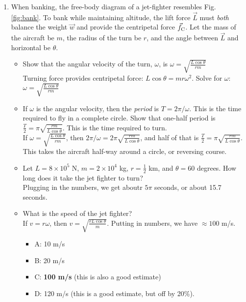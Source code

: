\documentclass[10pt]{article}
\begin{document}
\begin{enumerate}
\item When banking, the free-body diagram of a jet-fighter resembles Fig. \ref{fig:bank}.  To bank while maintaining altitude, the lift force $\vec{L}$ must \textit{both} balance the weight $\vec{w}$ and provide the centripetal force $\vec{f}_{\rm C}$.  Let the mass of the aircraft be $m$, the radius of the turn be $r$, and the angle between $\vec{L}$ and horizontal be $\theta$.
\begin{itemize}
\item Show that the angular velocity of the turn, $\omega$, is $\omega = \sqrt{\frac{L\cos\theta}{rm}}$ \\
Turning force provides centripetal force: $L\cos\theta = mr\omega^2$.  Solve for $\omega$: $\omega = \sqrt{\frac{L\cos\theta}{rm}}$
\item If $\omega$ is the angular velocity, then the \textit{period} is $T = 2\pi/\omega$.  This is the time required to fly in a complete circle.  Show that one-half period is $\frac{T}{2} = \pi\sqrt{\frac{r m}{L\cos\theta}}$.  This is the time required to turn. \\
If $\omega = \sqrt{\frac{L\cos\theta}{rm}}$, then $2\pi/\omega = 2\pi \sqrt{\frac{rm}{L\cos\theta}}$, and half of that is $\frac{T}{2} = \pi\sqrt{\frac{r m}{L\cos\theta}}$.  This takes the aircraft half-way around a circle, or reversing course.
\item Let $L = 8\times 10^5$ N, $m = 2\times 10^4$ kg, $r = \frac{1}{2}$ km, and $\theta = 60$ degrees.  How long does it take the jet fighter to turn? \\
Plugging in the numbers, we get aboutr $5\pi$ seconds, or about 15.7 seconds.
\item What is the speed of the jet fighter?\\
If $v = r\omega$, then $v = \sqrt{\frac{rL\cos\theta}{m}}$.  Putting in numbers, we have $\approx 100$ m/s.
\begin{itemize}
\item A: 10 m/s 
\item B: 20 m/s
\item C: \textbf{100 m/s} (this is also a good estimate)
\item D: 120 m/s (this is a good estimate, but off by 20\%).
\end{itemize}
\end{itemize} 
\end{enumerate}
\end{document}
